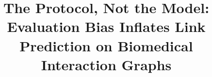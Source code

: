 \documentclass[review]{elsarticle}
\begin{document}
\begin{frontmatter}

\title{The Protocol, Not the Model: Evaluation Bias Inflates Link Prediction on
Biomedical Interaction Graphs}


\end{frontmatter}
\end{document}
